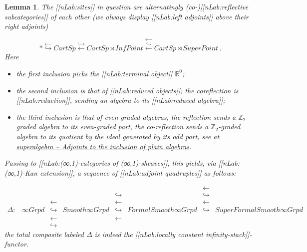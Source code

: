 \documentclass[12pt,titlepage]{article}
\newcommand{\itexarray}[1]{\begin{matrix}#1\end{matrix}}
\theoremstyle{plain}
\newtheorem{lemma}{Lemma}
\theoremstyle{definition}
\theoremstyle{remark}
\begin{document}
\begin{lemma}
\label{SequenceOfSites}\hypertarget{SequenceOfSites}{}
The [[nLab:sites]] in question are alternatingly (co-)[[nLab:reflective subcategories]] of each other (we always display [[nLab:left adjoints]] above their right adjoints)

\begin{displaymath}
\ast
  \stackrel{\longleftarrow}{\hookrightarrow}
  CartSp
  \stackrel{\hookrightarrow}{\longleftarrow}
  CartSp\rtimes InfPoint

  \stackrel{\longleftarrow}{\stackrel{\hookrightarrow}{\longleftarrow}}
  CartSp \rtimes SuperPoint
  \,.
\end{displaymath}
Here

\begin{itemize}%
\item the first inclusion picks the [[nLab:terminal object]] $\mathbb{R}^0$;


\item the second inclusion is that of [[nLab:reduced objects]]; the coreflection is [[nLab:reduction]], sending an algebra to its [[nLab:reduced algebra]];


\item the third inclusion is that of even-graded algebras, the reflection sends a $\mathbb{Z}_2$-graded algebra to its even-graded part, the co-reflection sends a $\mathbb{Z}_2$-graded algebra to its quotient by the ideal generated by its odd part, see at \emph{\href{super+algebra#AdjointsToInclusionOfPlainAlgebra}{superalgebra -- Adjoints to the inclusion of plain algebras}}.



\end{itemize}
Passing to [[nLab:(∞,1)-categories of (∞,1)-sheaves]], this yields, via [[nLab:(∞,1)-Kan extension]], a sequence of [[nLab:adjoint quadruples]] as follows:

\begin{displaymath}
\itexarray{
    & && && &\longleftarrow&
    \\
    & && &\hookrightarrow& &\hookrightarrow&
    \\
    & &\longleftarrow& &\longleftarrow& &\longleftarrow&
    \\
    \Delta \colon
    &
    \infty Grpd
    &\hookrightarrow&
    Smooth \infty Grpd
    &\hookrightarrow&
    FormalSmooth \infty Grpd
    &\hookrightarrow&
    SuperFormalSmooth \infty Grpd
    \\
    & &\longleftarrow& &\longleftarrow&
    \\
    & &\hookrightarrow&
  }
\end{displaymath}
the total composite labeled $\Delta$ is indeed the [[nLab:locally constant infinity-stack]]-functor.


\end{lemma}
\end{document}
